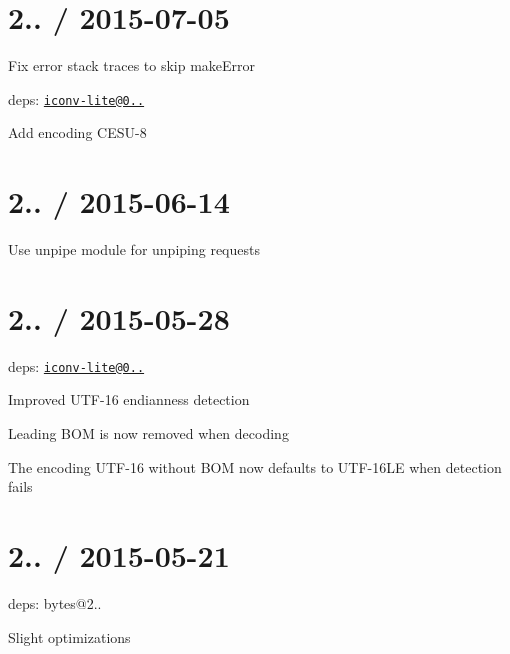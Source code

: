 \section*{2.. / 2015-\/07-\/05 }


\begin{DoxyItemize}
\item Fix error stack traces to skip {\ttfamily make\+Error}
\item deps\+: \href{mailto:iconv-lite@0.4.11}{\tt iconv-\/lite@0..}
\begin{DoxyItemize}
\item Add encoding C\+E\+S\+U-\/8
\end{DoxyItemize}
\end{DoxyItemize}

\section*{2.. / 2015-\/06-\/14 }


\begin{DoxyItemize}
\item Use {\ttfamily unpipe} module for unpiping requests
\end{DoxyItemize}

\section*{2.. / 2015-\/05-\/28 }


\begin{DoxyItemize}
\item deps\+: \href{mailto:iconv-lite@0.4.10}{\tt iconv-\/lite@0..}
\begin{DoxyItemize}
\item Improved U\+T\+F-\/16 endianness detection
\item Leading B\+OM is now removed when decoding
\item The encoding U\+T\+F-\/16 without B\+OM now defaults to U\+T\+F-\/16\+LE when detection fails
\end{DoxyItemize}
\end{DoxyItemize}

\section*{2.. / 2015-\/05-\/21 }


\begin{DoxyItemize}
\item deps\+: bytes@2..
\begin{DoxyItemize}
\item Slight optimizations
\end{DoxyItemize}
\end{DoxyItemize}

